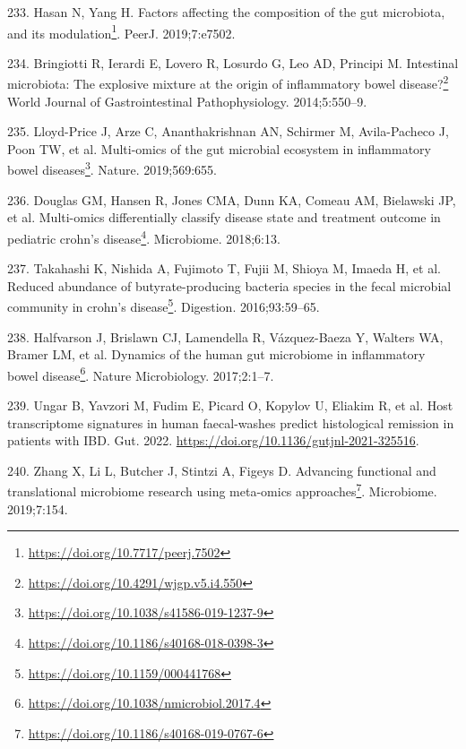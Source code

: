 \documentclass[
  a4paper,
]{book}
\DeclareRobustCommand{\href}[2]{#2\footnote{\url{#1}}}
\newlength{\cslhangindent}
\newlength{\cslentryspacingunit} %
\newenvironment{CSLReferences}[2] %
 {%
  \setlength{\parindent}{0pt}
  \ifodd #1
  \let\oldpar\par
  \def\par{\hangindent=\cslhangindent\oldpar}
  \fi
  \setlength{\parskip}{#2\cslentryspacingunit}
 }%
 {}
\begin{document}
\begin{CSLReferences}{0}{0}
\leavevmode{}%
233. Hasan N, Yang H. \href{https://doi.org/10.7717/peerj.7502}{Factors affecting the composition of the gut microbiota, and its modulation}. PeerJ. 2019;7:e7502.

\leavevmode{}%
234. Bringiotti R, Ierardi E, Lovero R, Losurdo G, Leo AD, Principi M. \href{https://doi.org/10.4291/wjgp.v5.i4.550}{Intestinal microbiota: The explosive mixture at the origin of inflammatory bowel disease?} World Journal of Gastrointestinal Pathophysiology. 2014;5:550--9.

\leavevmode{}%
235. Lloyd-Price J, Arze C, Ananthakrishnan AN, Schirmer M, Avila-Pacheco J, Poon TW, et al. \href{https://doi.org/10.1038/s41586-019-1237-9}{Multi-omics of the gut microbial ecosystem in inflammatory bowel diseases}. Nature. 2019;569:655.

\leavevmode{}%
236. Douglas GM, Hansen R, Jones CMA, Dunn KA, Comeau AM, Bielawski JP, et al. \href{https://doi.org/10.1186/s40168-018-0398-3}{Multi-omics differentially classify disease state and treatment outcome in pediatric crohn{'}s disease}. Microbiome. 2018;6:13.

\leavevmode{}%
237. Takahashi K, Nishida A, Fujimoto T, Fujii M, Shioya M, Imaeda H, et al. \href{https://doi.org/10.1159/000441768}{Reduced abundance of butyrate-producing bacteria species in the fecal microbial community in crohn's disease}. Digestion. 2016;93:59--65.

\leavevmode{}%
238. Halfvarson J, Brislawn CJ, Lamendella R, Vázquez-Baeza Y, Walters WA, Bramer LM, et al. \href{https://doi.org/10.1038/nmicrobiol.2017.4}{Dynamics of the human gut microbiome in inflammatory bowel disease}. Nature Microbiology. 2017;2:1--7.

\leavevmode{}%
239. Ungar B, Yavzori M, Fudim E, Picard O, Kopylov U, Eliakim R, et al. Host transcriptome signatures in human faecal-washes predict histological remission in patients with IBD. Gut. 2022. \url{https://doi.org/10.1136/gutjnl-2021-325516}.

\leavevmode{}%
240. Zhang X, Li L, Butcher J, Stintzi A, Figeys D. \href{https://doi.org/10.1186/s40168-019-0767-6}{Advancing functional and translational microbiome research using meta-omics approaches}. Microbiome. 2019;7:154.


\end{CSLReferences}
\end{document}
